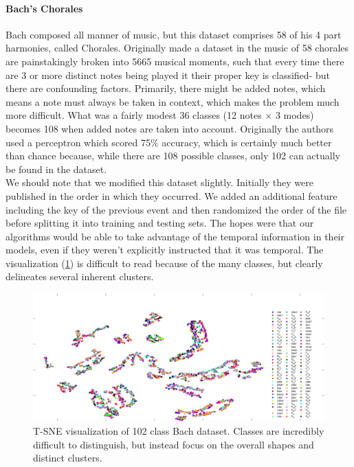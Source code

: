 \paragraph{Bach's Chorales}
Bach composed all manner of music, but this dataset comprises 58 of his 4 part harmonies, called Chorales.  Originally made a dataset in \cite{radiocini} the music of 58 chorales are painstakingly broken into 5665 musical moments, such that every time there are 3 or more distinct notes being played it their proper key is classified- but there are confounding factors. Primarily, there might be added notes, which means a note must always be taken in context, which makes the problem much more difficult.  What was a fairly modest 36 classes (12 notes $\times$ 3 modes) becomes 108 when added notes are taken into account.  Originally the authors used a perceptron which scored 75\% accuracy, which is certainly much better than chance because, while there are 108 possible classes, only 102 can actually be found in the dataset.  \\We should note that we modified this dataset slightly.  Initially they were published in the order in which they occurred.  We added an additional feature including the key of the previous event and then randomized the order of the file before splitting it into training and testing sets.  The hopes were that our algorithms would be able to take advantage of the temporal information in their models, even if they weren't explicitly instructed that it was temporal.  The visualization (\ref{fig:bachtsne}) is difficult to read because of the many classes, but clearly delineates several inherent clusters.
\begin{figure}
	\centering
	\includegraphics[width=0.9\linewidth]{figures/png/BachTSNE}
	\caption[T-SNE visualization of Bach dataset]{T-SNE visualization of 102 class Bach dataset.  Classes are incredibly difficult to distinguish, but instead focus on the overall shapes and distinct clusters.}
	\label{fig:bachtsne}
\end{figure}
